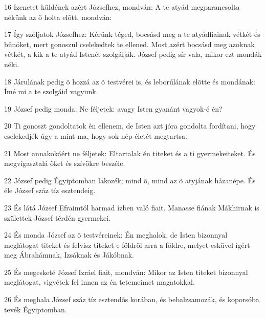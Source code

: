 \par 16 Izenetet küldének azért Józsefhez, mondván: A te atyád megparancsolta nékünk az õ holta elõtt, mondván:
\par 17 Így szóljatok Józsefhez: Kérünk téged, bocsásd meg a te atyádfiainak vétkét és bûnöket, mert gonoszul cselekedtek te ellened. Most azért bocsásd meg azoknak vétkét, a kik a te atyád Istenét szolgálják. József pedig sír vala, mikor ezt mondák néki.
\par 18 Járulának pedig õ hozzá az õ testvérei is, és leborúlának elõtte és mondának: Ímé mi a te szolgáid vagyunk.
\par 19 József pedig monda: Ne féljetek: avagy Isten gyanánt vagyok-é én?
\par 20 Ti gonoszt gondoltatok én ellenem, de Isten azt jóra gondolta fordítani, hogy cselekedjék úgy a mint ma, hogy sok nép életét megtartsa.
\par 21 Most annakokáért ne féljetek: Eltartalak én titeket és a ti gyermekeiteket. És megvígasztalá õket és szívökre beszéle.
\par 22 József pedig Égyiptomban lakozék; mind õ, mind az õ atyjának házanépe. És éle József száz tíz esztendeig.
\par 23 És látá József Efraimtól harmad ízben való fiait. Manasse fiának Mákhirnak is születtek József térdén gyermekei.
\par 24 És monda József az õ testvéreinek: Én meghalok, de Isten bizonnyal meglátogat titeket és felvisz titeket e földrõl arra a földre, melyet esküvel ígért meg Ábrahámnak, Izsáknak és Jákóbnak.
\par 25 És megesketé József Izráel fiait, mondván: Mikor az Isten titeket bizonnyal meglátogat, vigyétek fel innen az én tetemeimet magatokkal.
\par 26 És meghala József száz tíz esztendõs korában, és bebalzsamozák, és koporsóba tevék Égyiptomban.




